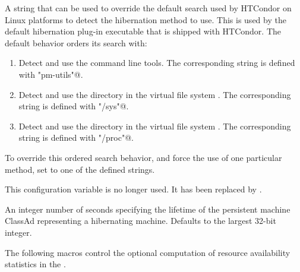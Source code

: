 \begin{description}
\label{param:LinuxHibernationMethod}
\item[\Macro{LINUX\_HIBERNATION\_METHOD}]
  A string that can be used to override the default search used by
  HTCondor on Linux platforms to detect the hibernation method to use.
  This is used by the default hibernation plug-in executable that is
  shipped with HTCondor.  The default behavior orders its search with:
  \begin{enumerate}
  \item Detect and use the  command line tools.
    The corresponding string is defined with \verb@"pm-utils"@. 
  \item Detect and use the directory in the virtual file system
    .
    The corresponding string is defined with \verb@"/sys"@.
  \item Detect and use the directory in the virtual file system
    .
    The corresponding string is defined with \verb@"/proc"@.
  \end{enumerate}
  To override this ordered search behavior,
  and force the use of one particular method,
  set  to one of the defined strings.

\label{param:OfflineLog}
\item[\Macro{OFFLINE\_LOG}]
  This configuration variable is no longer used.
  It has been replaced by .

\label{param:OfflineExpireAdsAfter}
\item[\Macro{OFFLINE\_EXPIRE\_ADS\_AFTER}]
  An integer number of seconds specifying the lifetime of the
  persistent machine ClassAd representing a hibernating machine.
  Defaults to the largest 32-bit integer.

\end{description}

The following macros control the optional computation of resource
availability statistics in the .

